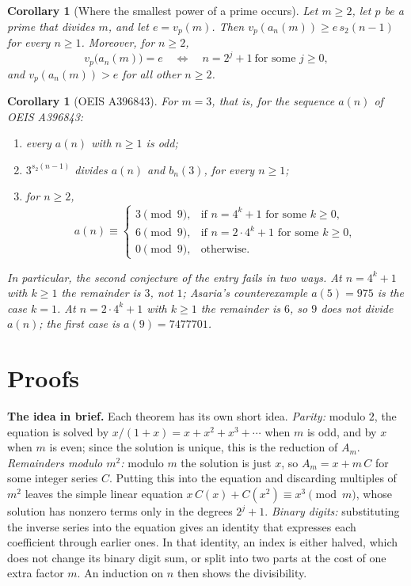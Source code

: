\documentclass[11pt,a4paper]{article}
\newtheorem{corollary}[theorem]{Corollary}
\theoremstyle{definition}
\theoremstyle{remark}
\newcommand{\para}[1]{\par\medskip\noindent\textbf{#1}\enspace}
\begin{document}
\begin{corollary}[Where the smallest power of a prime occurs]\label{cor:val}
Let $m\ge2$, let $p$ be a prime that divides $m$, and let $e=v_p(m)$. Then $v_p(a_n(m))\ge e\,s_2(n-1)$ for every
$n\ge1$. Moreover, for $n\ge2$,
\[
v_p\bigl(a_n(m)\bigr)=e\quad\Longleftrightarrow\quad n=2^j+1\ \text{for some }j\ge0,
\]
and $v_p(a_n(m))>e$ for all other $n\ge2$.
\end{corollary}

\begin{corollary}[OEIS A396843]\label{cor:entry}
For $m=3$, that is, for the sequence $a(n)$ of OEIS A396843:
\begin{enumerate}[label=(\alph*)]
\item every $a(n)$ with $n\ge1$ is odd;
\item $3^{s_2(n-1)}$ divides $a(n)$ and $b_n(3)$, for every $n\ge1$;
\item for $n\ge2$,
\[
a(n)\equiv\begin{cases}3\pmod9,&\text{if }n=4^k+1\text{ for some }k\ge0,\\
6\pmod9,&\text{if }n=2\cdot4^k+1\text{ for some }k\ge0,\\
0\pmod9,&\text{otherwise.}\end{cases}
\]
\end{enumerate}
In particular, the second conjecture of the entry fails in two ways. At $n=4^k+1$ with $k\ge1$ the remainder is $3$,
not $1$; Asaria's counterexample $a(5)=975$ is the case $k=1$. At $n=2\cdot4^k+1$ with $k\ge1$ the remainder is $6$, so
$9$ does not divide $a(n)$; the first case is $a(9)=7477701$.
\end{corollary}

\section{Proofs}\label{sec:proofs}

\para{The idea in brief.} Each theorem has its own short idea.
\emph{Parity:} modulo $2$, the equation is solved by $x/(1+x)=x+x^2+x^3+\cdots$ when $m$ is odd, and by $x$ when $m$ is
even; since the solution is unique, this is the reduction of $A_m$.
\emph{Remainders modulo $m^2$:} modulo $m$ the solution is just $x$, so $A_m=x+m\,C$ for some integer series $C$.
Putting this into the equation and discarding multiples of $m^2$ leaves the simple linear equation
$x\,C(x)+C(x^2)\equiv x^3\pmod m$, whose solution has nonzero terms only in the degrees $2^j+1$.
\emph{Binary digits:} substituting the inverse series into the equation gives an identity that expresses each
coefficient through earlier ones. In that identity, an index is either halved, which does not change its binary digit
sum, or split into two parts at the cost of one extra factor $m$. An induction on $n$ then shows the divisibility.
\end{document}
